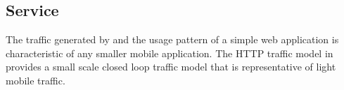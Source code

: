 \subsection{Service}
The traffic generated by and the usage pattern of a simple web application is characteristic of any smaller mobile application. The HTTP traffic model in \cite{liu2001traffic} provides a small scale closed loop traffic model that is representative of light mobile traffic.